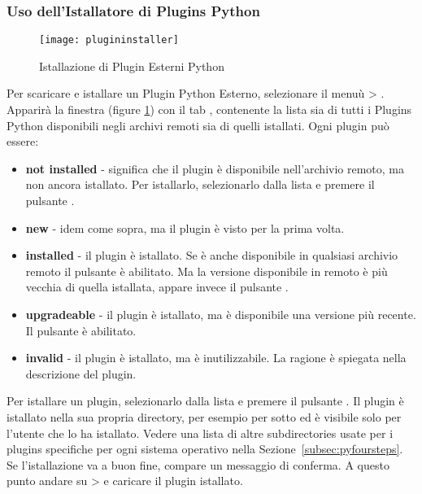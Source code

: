 \subsubsection{Uso dell'Istallatore di Plugins Python }\label{sec:python_plugin_installer}

\begin{figure}[ht]
   \begin{center}
   \caption{Istallazione di Plugin Esterni Python \nixcaption}
\label{fig:plugininstaller}\smallskip
   \texttt{[image: plugininstaller]}
\end{center}
\end{figure}

Per scaricare e istallare un Plugin Python Esterno, selezionare il menuù  > .
Apparirà la finestra   (figure \ref{fig:plugininstaller}) con il tab , contenente la lista sia di tutti i Plugins Python disponibili negli archivi remoti sia di quelli istallati. Ogni plugin può essere:
\begin{itemize}
\item \textbf{not installed} - significa che il plugin è disponibile nell'archivio remoto, ma non ancora istallato. Per istallarlo, selezionarlo dalla lista e premere il pulsante  .
\item \textbf{new} - idem come sopra, ma il plugin è visto per la prima volta.
\item \textbf{installed} - il plugin è istallato. Se è anche disponibile in qualsiasi archivio remoto il pulsante  è abilitato. Ma la versione disponibile in remoto è più vecchia di quella istallata, appare invece il pulsante .
\item \textbf{upgradeable} - il plugin è istallato, ma è disponibile una versione più recente. Il pulsante  è abilitato.
\item \textbf{invalid} - il plugin è istallato, ma è inutilizzabile. La ragione è spiegata nella descrizione del plugin.
\end{itemize}


Per istallare un plugin, selezionarlo dalla lista e premere il pulsante  . Il plugin è istallato nella sua propria directory, per esempio per \nix sotto  ed è visibile solo per l'utente che lo ha istallato. Vedere una lista di altre subdirectories usate per i plugins specifiche per ogni sistema operativo nella Sezione~\ref{subsec:pyfoursteps}. Se l'istallazione va a buon fine, compare un messaggio di conferma. A questo punto andare su  >  e caricare il plugin istallato.

